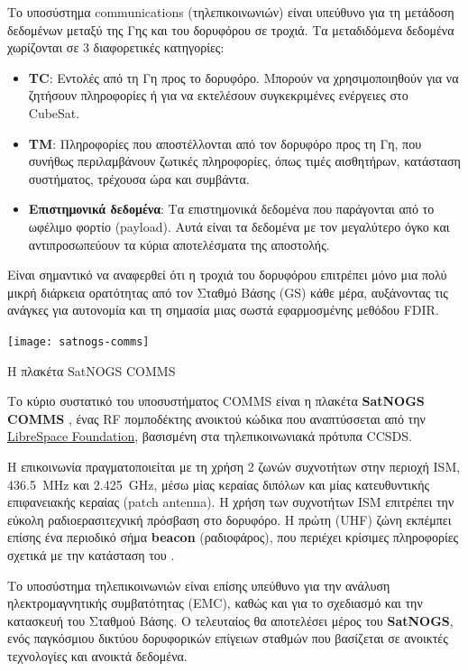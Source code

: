 \documentclass[a4paper,nobib]{tufte-book}
\begin{document}
Το υποσύστημα communications (τηλεπικοινωνιών) είναι υπεύθυνο για τη μετάδοση δεδομένων μεταξύ της Γης και του δορυφόρου σε τροχιά. Τα μεταδιδόμενα δεδομένα χωρίζονται σε 3 διαφορετικές κατηγορίες\autocite{DDJF_TTC}:
\begin{itemize}
	\item \textbf{\acf{TC}}: Εντολές από τη Γη προς το δορυφόρο. Μπορούν να χρησιμοποιηθούν για να ζητήσουν πληροφορίες ή για να εκτελέσουν συγκεκριμένες ενέργειες στο CubeSat.
	\item \textbf{\acf{TM}}: Πληροφορίες που αποστέλλονται από τον δορυφόρο προς τη Γη, που συνήθως περιλαμβάνουν ζωτικές πληροφορίες, όπως τιμές αισθητήρων, κατάσταση συστήματος, τρέχουσα ώρα και συμβάντα.
	\item \textbf{Επιστημονικά δεδομένα}: Τα επιστημονικά δεδομένα που παράγονται από το ωφέλιμο φορτίο (payload). Αυτά είναι τα δεδομένα με τον μεγαλύτερο όγκο και αντιπροσωπεύουν τα κύρια  αποτελέσματα της αποστολής.
\end{itemize}

Είναι σημαντικό να αναφερθεί ότι η τροχιά του δορυφόρου επιτρέπει μόνο μια πολύ μικρή διάρκεια ορατότητας από τον Σταθμό Βάσης (\acl{GS}) κάθε μέρα, αυξάνοντας τις ανάγκες για αυτονομία και τη σημασία μιας σωστά εφαρμοσμένης μεθόδου \acs{FDIR}.

\begin{marginfigure}
	\texttt{[image: satnogs-comms]}
	\caption{Η πλακέτα SatNOGS COMMS}
\end{marginfigure}

Το κύριο συστατικό του υποσυστήματος \acs{COMMS} είναι η πλακέτα \textbf{SatNOGS COMMS} \autocite{surligas_satnogscomms_2021}, ένας \acs{RF} πομποδέκτης ανοικτού κώδικα που αναπτύσσεται από την \href{https://libre.space/}{LibreSpace Foundation}, βασισμένη στα τηλεπικοινωνιακά πρότυπα \acs{CCSDS}.

Η επικοινωνία πραγματοποιείται με τη χρήση 2 ζωνών συχνοτήτων στην περιοχή \acs{ISM}, \SI{436.5}{\mega\hertz} και \SI{2.425}{\giga\hertz}, μέσω μίας κεραίας διπόλων και μίας κατευθυντικής επιφανειακής κεραίας (patch antenna). Η χρήση των συχνοτήτων \acs{ISM} επιτρέπει την εύκολη ραδιοερασιτεχνική πρόσβαση στο δορυφόρο. Η πρώτη (\acs{UHF}) ζώνη εκπέμπει επίσης ένα περιοδικό σήμα \textbf{beacon} (ραδιοφάρος), που περιέχει κρίσιμες πληροφορίες σχετικά με την κατάσταση του .

Το υποσύστημα τηλεπικοινωνιών είναι επίσης υπεύθυνο για την ανάλυση ηλεκτρομαγνητικής συμβατότητας (\acs{EMC}), καθώς και για το σχεδιασμό και την κατασκευή του Σταθμού Βάσης. Ο τελευταίος θα αποτελέσει μέρος του \textbf{SatNOGS}\autocite{white_overview_satellite_2018}, ενός παγκόσμιου δικτύου δορυφορικών επίγειων σταθμών που βασίζεται σε ανοικτές τεχνολογίες και ανοικτά δεδομένα.
\end{document}
